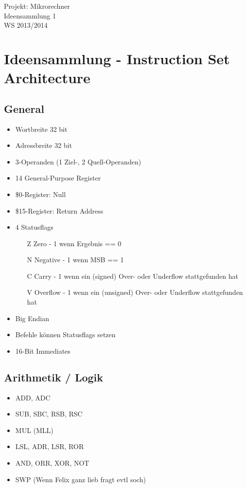\documentclass[a4paper]{article}
\newcommand{\titelblock}{
\sloppy
\begin{center}
\sffamily
{\Large{\veranstaltung \\}}
{\Huge{\doctitle  \nummer}\\}
\vspace{0.5cm}
\tutorium \\
\hrulefill
\end{center}
}
\newcommand{\doctitle}{Ideensammlung}
\newcommand{\nummer}{ 1} %
\newcommand{\tutorium}{WS 2013/2014}
\newcommand{\veranstaltung}{Projekt: Mikrorechner}
\begin{document}
\titelblock

\section{Ideensammlung - Instruction Set Architecture}

\subsection{General}

\begin{multicols}{2}
\begin{itemize}
  \item Wortbreite 32 bit
  \item Adressbreite 32 bit
  \item 3-Operanden (1 Ziel-, 2 Quell-Operanden)
  \item 14 General-Purpose Register
  \item \$0-Register: Null
  \item \$15-Register: Return Address
  \item 4 Statusflags
  \begin{itemize}
    \item[Z] Zero - 1 wenn Ergebnis == 0
    \item[N] Negative - 1 wenn MSB == 1
    \item[C] Carry - 1 wenn ein (signed) Over- oder Underflow stattgefunden hat
    \item[V] Overflow - 1 wenn ein (unsigned) Over- oder Underflow stattgefunden hat
  \end{itemize}
  \item Big Endian
  \item Befehle können Statusflags setzen
  \item 16-Bit Immediates
\end{itemize}

\subsection{Arithmetik / Logik}

\begin{itemize}
\item ADD, ADC
\item SUB, SBC, RSB, RSC
\item MUL (MLL)
\item LSL, ADR, LSR, ROR 
\item AND, ORR, XOR, NOT
\item SWP (Wenn Felix ganz lieb fragt evtl soch)
\end{itemize}


\end{multicols}
\end{document}
